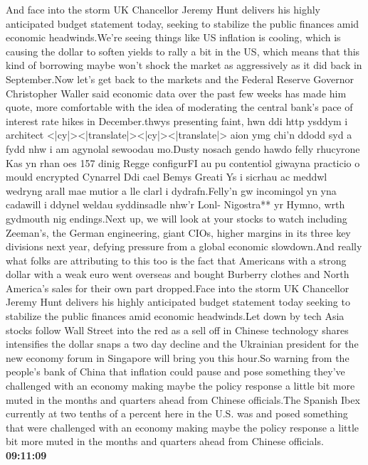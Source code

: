 \documentclass{article}%
\begin{document}
And face into the storm UK Chancellor Jeremy Hunt delivers his highly anticipated budget statement today, seeking to stabilize the public finances amid economic headwinds.We're seeing things like US inflation is cooling, which is causing the dollar to soften yields to rally a bit in the US, which means that this kind of borrowing maybe won't shock the market as aggressively as it did back in September.Now let's get back to the markets and the Federal Reserve Governor Christopher Waller said economic data over the past few weeks has made him quote, more comfortable with the idea of moderating the central bank's pace of interest rate hikes in December.thwys presenting faint, hwn ddi http ysddym i architect <|cy|><|translate|><|cy|><|translate|> aion ymg chi'n ddodd syd a fydd nhw i am agynolal sewoodau mo.Dusty nosach gendo hawdo felly rhucyrone  Kas yn rhan oes 157 dinig Regge configurFI au pu contentiol giwayna practicio o mould encrypted Cynarrel Ddi cael Bemys Greati Ys i sicrhau ac meddwl wedryng arall mae mutior a lle clarl i dydrafn.Felly'n gw incomingol yn yna cadawill i ddynel weldau syddinsadle nhw'r Lonl{-} Nigostra** yr Hymno, wrth gydmouth nig endings.Next up, we will look at your stocks to watch including Zeeman's, the German engineering, giant CIOs, higher margins in its three key divisions next year, defying pressure from a global economic slowdown.And really what folks are attributing to this too is the fact that Americans with a strong dollar with a weak euro went overseas and bought Burberry clothes and North America's sales for their own part dropped.Face into the storm UK Chancellor Jeremy Hunt delivers his highly anticipated budget statement today seeking to stabilize the public finances amid economic headwinds.Let down by tech Asia stocks follow Wall Street into the red as a sell off in Chinese technology shares intensifies the dollar snaps a two day decline and the Ukrainian president for the new economy forum in Singapore will bring you this hour.So warning from the people's bank of China that inflation could pause and pose something they've challenged with an economy making maybe the policy response a little bit more muted in the months and quarters ahead from Chinese officials.The Spanish Ibex currently at two tenths of a percent here in the U.S.  was and posed something that were challenged with an economy making maybe the policy response a little bit more muted in the months and quarters ahead from Chinese officials.%
\textbf{09:11:09}%
\newline%
\end{document}
